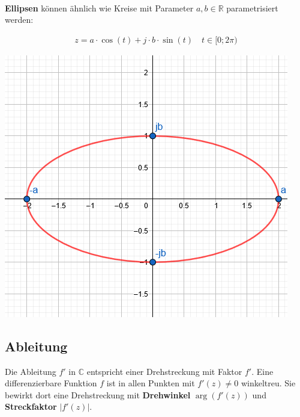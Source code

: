 ~\\
\begin{minipage}{\columnwidth}	
	\noindent\textbf{Ellipsen} können ähnlich wie Kreise mit Parameter $a,b \in \mathbb{R}$ parametrisiert werden:
	
	\begin{minipage}{0.6\textwidth}
		\begin{align*}
			z = a\cdot\cos(t) + j\cdot b \cdot \sin(t) \quad t \in [0; 2\pi)
		\end{align*}
	\end{minipage}%
	\begin{minipage}{0.4\textwidth}
		\includegraphics[width=\columnwidth]{Images/parameter_ellipse}
	\end{minipage}
\end{minipage}

\newpage 

\subsection{Ableitung}
Die Ableitung $f'$ in $\mathbb{C}$ entspricht einer Drehstreckung mit Faktor $f'$. Eine differenzierbare Funktion $f$ ist in allen Punkten mit $f'(z) \neq 0$ winkeltreu. Sie bewirkt dort eine Drehstreckung mit \textbf{Drehwinkel} $\arg(f'(z))$ und \textbf{Streckfaktor} $|f'(z)|$.

